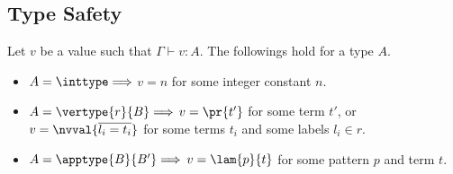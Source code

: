 

\subsection{Type Safety}
\label{appendix:typesafety}
\begin{lemma}
\label{lemma:typedvalue}
Let $v$ be a value such that $\Gamma \vdash v:A$. The followings hold for a type $A$.
\begin{itemize}
  \item $A=\inttype \Longrightarrow $ $v = n$ for some integer constant $n$.
  \item $A=\vertype{r}{B} \Longrightarrow $ $v = \pr{t'}$ for some term $t'$, or $v=\nvval{\overline{l_i=t_i}}$ for some terms $t_i$ and some labels $l_i\in r$.
  \item $A=\apptype{B}{B'} \Longrightarrow  $ $v=\lam{p}{t}$ for some pattern $p$ and term $t$.
\end{itemize}
\end{lemma}

